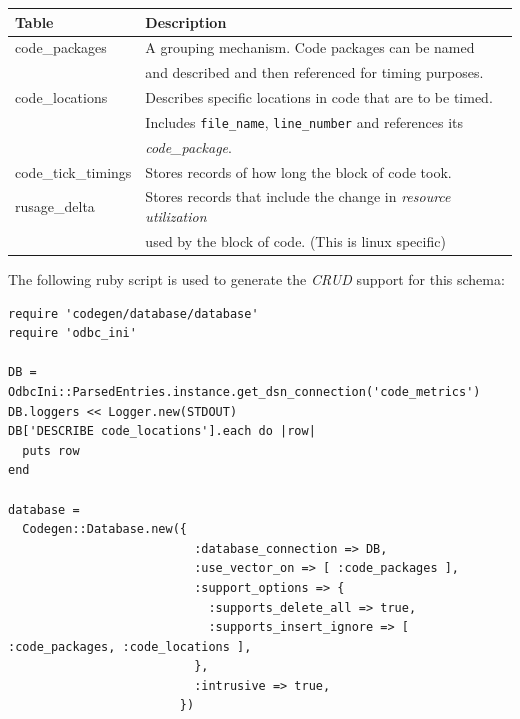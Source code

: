 \documentclass[11pt]{article}
\begin{document}
\begin{center}
\begin{tabular}{ll}
 Table                    &  Description                                                             \\
\hline
 code\_{}packages         &  A grouping mechanism. Code packages can be named                        \\
                          &  and described and then referenced for timing purposes.                  \\
 code\_{}locations        &  Describes specific locations in code that are to be timed.              \\
                          &  Includes \texttt{file\_name}, \texttt{line\_number} and references its  \\
                          &  \emph{code\_{}package}.                                                 \\
 code\_{}tick\_{}timings  &  Stores records of how long the block of code took.                      \\
 rusage\_{}delta          &  Stores records that include the change in \emph{resource utilization}   \\
                          &  used by the block of code. (This is linux specific)                     \\
\end{tabular}
\end{center}




   The following ruby script is used to generate the \emph{CRUD} support for this schema:


\lstset{language=Ruby}
\begin{lstlisting}
require 'codegen/database/database'
require 'odbc_ini'

DB = OdbcIni::ParsedEntries.instance.get_dsn_connection('code_metrics')
DB.loggers << Logger.new(STDOUT)
DB['DESCRIBE code_locations'].each do |row|
  puts row
end

database = 
  Codegen::Database.new({ 
                          :database_connection => DB,
                          :use_vector_on => [ :code_packages ],
                          :support_options => { 
                            :supports_delete_all => true, 
                            :supports_insert_ignore => [ :code_packages, :code_locations ],
                          },
                          :intrusive => true,
                        })
\end{lstlisting}
\end{document}
